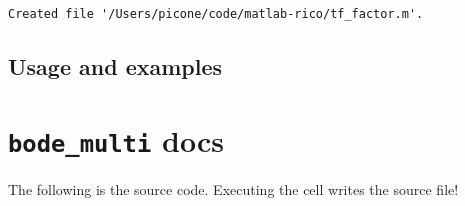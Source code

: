 \begin{verbatim}
Created file '/Users/picone/code/matlab-rico/tf_factor.m'.
\end{verbatim}

\hypertarget{usage-and-examples}{%
\subsection{Usage and examples}\label{usage-and-examples}}

\hypertarget{bode_multi-docs}{%
\section{\texorpdfstring{\texttt{bode_multi}
docs}{ docs}}\label{bode_multi-docs}}

The following is the source code. Executing the cell writes the source
file!

